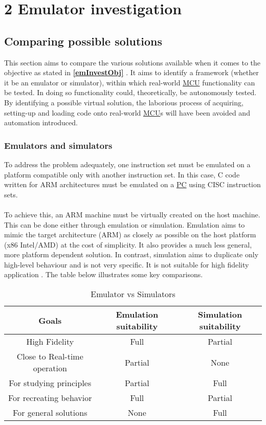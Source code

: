 

\chapter*{2 Emulator investigation}
\setcounter{chapter}{2}
\setcounter{section}{0}
\setcounter{figure}{0}
\setcounter{table}{0}
\label{2emul}


\section{Comparing possible solutions}
\label{CompSolu}
This section aims to compare the various solutions available when it comes to the objective as stated in \textbf{\ref{emInvestObj} }. It aims to identify a framework (whether it be an emulator or simulator), within which real-world \hyperref[listAbr]{MCU} functionality can be tested. In doing so functionality could, theoretically, be autonomously tested. By identifying a possible virtual solution, the laborious process of acquiring, setting-up and loading code onto real-world \hyperref[listAbr]{MCU}s will have been avoided and automation introduced.   
\subsection{Emulators and simulators}
\label{emuVsSim}
To address the problem adequately, one instruction set must be emulated on a platform compatible only with another instruction set. In this case, C code written for ARM architectures must be emulated on a \hyperref[listAbr]{PC} using CISC instruction sets.
\\\\
To achieve this, an ARM machine must be virtually created on the host machine. This can be done either through emulation or simulation. Emulation aims to mimic the target architecture (ARM) as closely as possible on the host platform (x86 Intel/AMD) at the cost of simplicity. It also provides a much less general, more platform dependent solution. In contrast, simulation aims to duplicate only high-level behaviour and is not very specific. It is not suitable for high fidelity application \cite{Chris}. The table below illustrates some key comparisons.

\begin{table}[H]
\begin{tabular}{ |c|c|c| } 
 \hline
 Goals & Emulation suitability & Simulation suitability \\ 
 \hline
 High Fidelity & Full & Partial \\ 
 Close to Real-time operation& Partial & None \\ 
 For studying principles & Partial & Full\\ 
 For recreating behavior & Full & Partial\\ 
 For general solutions & None & Full\\ 
 \hline
\end{tabular}
\caption{Emulator vs Simulators}
\label{emVsim}
\end{table}

